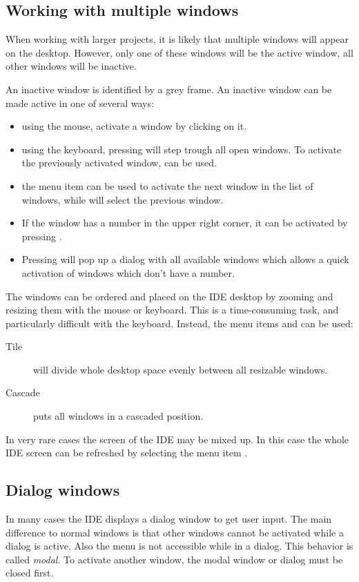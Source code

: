 \subsection{Working with multiple windows}
\label{se:multiplewindows}
When working with larger projects, it is likely that multiple windows 
will appear on the desktop. However, only one of these windows will be 
the active window, all other windows will be inactive.

An inactive window is identified by a grey frame. An inactive window can
be made active in one of several ways:
\begin{itemize}
\item using the mouse, activate a window by clicking on it.
\item using the keyboard, pressing  will step trough all open 
windows. To activate the previously activated window,  can
be used.
\item the menu item  can be used to activate the next 
window in the list of windows, while  will select
the previous window.
\item If the window has a number in the upper right corner, it can be
activated by pressing .
\item Pressing  will pop up a dialog with all 
available windows which allows a quick activation of windows which 
don't have a number.
\end{itemize}

The windows can be ordered and placed on the IDE desktop by zooming and
resizing them with the mouse or keyboard. This is a time-consuming task, 
and particularly difficult with the keyboard. Instead, the menu items
 and  can be used:
\begin{description}
\item[Tile] will divide whole desktop space evenly between all resizable 
windows. 
\item[Cascade] puts all windows in a cascaded position. 
\end{description}

In very rare cases the screen of the IDE may be mixed up. In this
case the whole IDE screen can be refreshed by selecting the menu item 
.
%
%
\subsection{Dialog windows}
\label{se:dialogwindow}
In many cases the IDE displays a dialog window to get user input.
The main difference to normal windows is that other windows cannot be
activated while a dialog is active. Also the menu is not accessible while in
a dialog. This behavior is called \emph{modal}. To activate another window, 
the modal window or dialog must be closed first.

